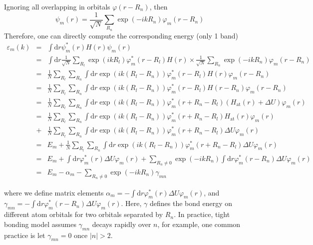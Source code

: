 \documentclass{article}
\begin{document}
Ignoring all overlapping in orbitals $\varphi(r-R_n)$, then 
\begin{equation}
    \psi_m (r) =\dfrac{1}{\sqrt{N}}\underset{R_n}{\sum} \exp (- i k R_n) \varphi_m(r-R_n)
\end{equation}
Therefore, one can directly compute the corresponding energy (only 1 band)
\begin{eqnarray*}  \varepsilon_m (k) & = & \int \text{d} r \psi_m^{\ast} (r) H (r) \psi_m (r)\\  & = & \int \text{d} r \frac{1}{\sqrt{N}} \underset{R_l}{\sum} \exp (i k  R_l) \varphi_m^{\ast} (r - R_l) H (r) \times \frac{1}{\sqrt{N}}  \underset{R_n}{\sum} \exp (- i k R_n) \varphi_m (r - R_n)\\  & = & \frac{1}{N} \underset{R_l}{\sum} \underset{R_n}{\sum} \int \text{d} r  \exp (i k (R_l - R_n)) \varphi_m^{\ast} (r - R_l) H (r) \varphi_m (r -  R_n)\\  & = & \frac{1}{N} \underset{R_l}{\sum} \underset{R_n}{\sum} \int \text{d} r  \exp (i k (R_l - R_n)) \varphi_m^{\ast} (r - R_l) H (r - R_n) \varphi_m (r -  R_n)\\  & = & \frac{1}{N} \underset{R_l}{\sum} \underset{R_n}{\sum} \int \text{d} r  \exp (i k (R_l - R_n)) \varphi_m^{\ast} (r + R_n - R_l)  (H_{\text{at}} (r)  + \Delta U) \varphi_m (r)\\  & = & \frac{1}{N} \underset{R_l}{\sum} \underset{R_n}{\sum} \int \text{d} r  \exp (i k (R_l - R_n)) \varphi_m^{\ast} (r + R_n - R_l) H_{\text{at}} (r)  \varphi_m (r)\\  & + & \frac{1}{N} \underset{R_l}{\sum} \underset{R_n}{\sum} \int \text{d} r  \exp (i k (R_l - R_n)) \varphi_m^{\ast} (r + R_n - R_l) \Delta U \varphi_m  (r)\\  & = & E_m + \frac{1}{N} \underset{R_l}{\sum} \underset{R_n}{\sum} \int  \text{d} r \exp (i k (R_l - R_n)) \varphi_m^{\ast} (r + R_n - R_l) \Delta U  \varphi_m (r)\\  & = & E_m + \int \text{d} r \varphi_m^{\ast} (r) \Delta U \varphi_m (r) +  \underset{R_n \neq 0}{\sum} \exp (- i k R_n) \int \text{d} r  \varphi_m^{\ast} (r - R_n) \Delta U \varphi_m (r)\\  & = & E_m - \alpha_m - \underset{R_n \neq 0}{\sum} \exp (- i k R_n) \gamma_{m  n}\end{eqnarray*}


where we define matrix elements $\alpha_m=-\int \text{d} r \varphi_m^{\ast} (r) \Delta U \varphi_m (r)$, and $\gamma_{m  n} = -\int \text{d} r \varphi_m^{\ast} (r - R_n) \Delta U \varphi_m (r)$.
Here, $\gamma$ defines the bond energy on different atom orbitals for two orbitals separated by $R_n$. In practice, tight bonding model assumes $\gamma_{mn}$ decays rapidly over $n$, for example, one common practice is let $\gamma_{mn}=0$ once $|n|>2$.
\end{document}
